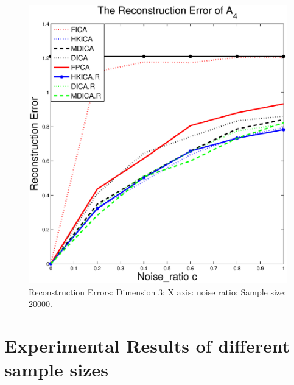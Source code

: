 \begin{figure}[t]
	\includegraphics[width =0.45\columnwidth]{images/error4_d3}
\caption{
\label{fig:Error_d3}
 Reconstruction Errors: Dimension 3; X axis: noise ratio; Sample size: 20000.}
\end{figure}

\section{Experimental Results of different sample sizes}
